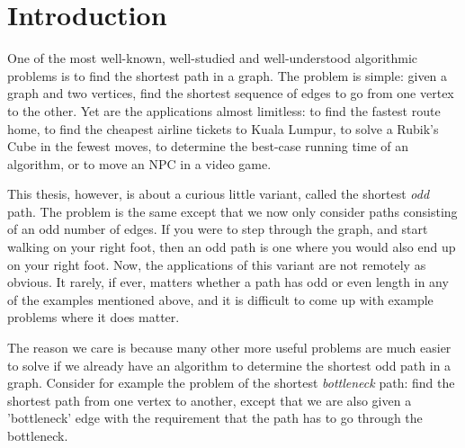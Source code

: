\chapter{Introduction}

One of the most well-known, well-studied and well-understood algorithmic problems is to find the shortest path in a graph. The problem is simple: given a graph and two vertices, find the shortest sequence of edges to go from one vertex to the other. Yet are the applications almost limitless: to find the fastest route home, to find the cheapest airline tickets to Kuala Lumpur, to solve a Rubik's Cube in the fewest moves, to determine the best-case running time of an algorithm, or to move an NPC in a video game.

This thesis, however, is about a curious little variant, called the shortest \emph{odd} path. The problem is the same except that we now only consider paths consisting of an odd number of edges. If you were to step through the graph, and start walking on your right foot, then an odd path is one where you would also end up on your right foot. Now, the applications of this variant are not remotely as obvious. It rarely, if ever, matters whether a path has odd or even length in any of the examples mentioned above, and it is difficult to come up with example problems where it does matter.

The reason we care is because many other more useful problems are much easier to solve if we already have an algorithm to determine the shortest odd path in a graph. Consider for example the problem of the shortest \emph{bottleneck} path: find the shortest path from one vertex to another, except that we are also given a 'bottleneck' edge with the requirement that the path has to go through the bottleneck. 

